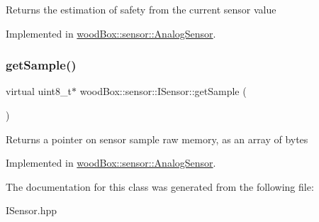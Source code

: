 Returns the estimation of safety from the current sensor value 

Implemented in \mbox{\hyperlink{classwood_box_1_1sensor_1_1_analog_sensor_a74ddcfe84f3f5b9d7010442f365c4eee}{wood\+Box\+::sensor\+::\+Analog\+Sensor}}.

\mbox{\label{classwood_box_1_1sensor_1_1_i_sensor_a9de8041b991b76cc2f6fcc3b6a1bf363}} 
\subsubsection{\texorpdfstring{get\+Sample()}{getSample()}}
{\footnotesize\ttfamily virtual uint8\+\_\+t$\ast$ wood\+Box\+::sensor\+::\+I\+Sensor\+::get\+Sample (\begin{DoxyParamCaption}{ }\end{DoxyParamCaption})\hspace{0.3cm}{\ttfamily [pure virtual]}}

Returns a pointer on sensor sample raw memory, as an array of bytes 

Implemented in \mbox{\hyperlink{classwood_box_1_1sensor_1_1_analog_sensor_ae78c25d8c01ba9acd03f90f278966189}{wood\+Box\+::sensor\+::\+Analog\+Sensor}}.



The documentation for this class was generated from the following file\+:\begin{DoxyCompactItemize}
\item 
I\+Sensor.\+hpp\end{DoxyCompactItemize}
